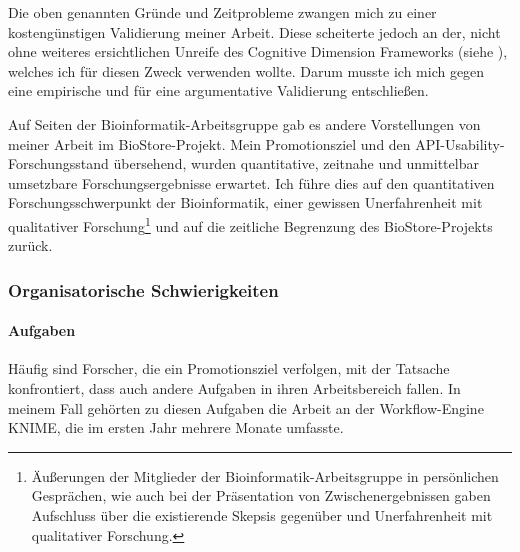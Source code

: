 
Die oben genannten Gründe und Zeitprobleme zwangen mich zu einer kostengünstigen Validierung meiner Arbeit. Diese scheiterte jedoch an der, nicht ohne weiteres ersichtlichen Unreife des Cognitive Dimension Frameworks (siehe ), welches ich für diesen Zweck verwenden wollte. Darum musste ich mich gegen eine empirische und für eine argumentative Validierung entschließen. 

Auf Seiten der Bioinformatik-Arbeitsgruppe gab es andere Vorstellungen von meiner Arbeit im BioStore-Projekt. Mein Promotionsziel und den API-Usability-Forschungsstand übersehend, wurden quantitative, zeitnahe und unmittelbar umsetzbare Forschungsergebnisse erwartet. Ich führe dies auf den quantitativen Forschungsschwerpunkt der Bioinformatik, einer gewissen Unerfahrenheit mit qualitativer Forschung\footnote{Äußerungen der Mitglieder der Bioinformatik-Arbeitsgruppe in persönlichen Gesprächen, wie auch bei der Präsentation von Zwischenergebnissen gaben Aufschluss über die existierende Skepsis gegenüber und Unerfahrenheit mit qualitativer Forschung.} und auf die zeitliche Begrenzung des BioStore-Projekts zurück.



\subsubsection{Organisatorische Schwierigkeiten}

\paragraph{Aufgaben}

Häufig sind Forscher, die ein Promotionsziel verfolgen, mit der Tatsache konfrontiert, dass auch andere Aufgaben in ihren Arbeitsbereich fallen. In meinem Fall gehörten zu diesen Aufgaben die Arbeit an der Workflow-Engine KNIME, die im ersten Jahr mehrere Monate umfasste.

